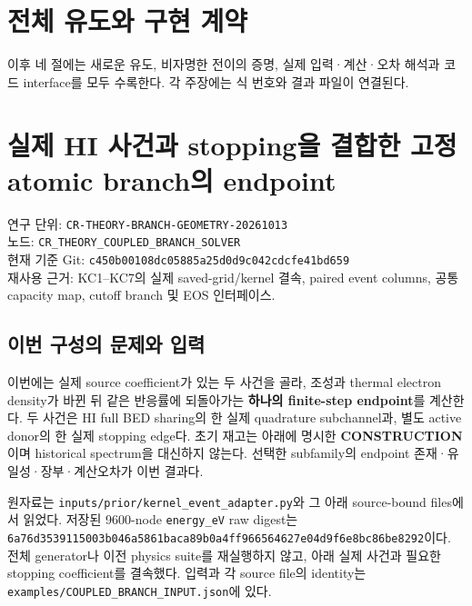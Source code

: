 \hypertarget{uxc804uxccb4-uxc720uxb3c4uxc640-uxad6cuxd604-uxacc4uxc57d}{%
\section{전체 유도와 구현 계약}\label{uxc804uxccb4-uxc720uxb3c4uxc640-uxad6cuxd604-uxacc4uxc57d}}

이후 네 절에는 새로운 유도, 비자명한 전이의 증명, 실제 입력·계산·오차 해석과 코드 interface를 모두 수록한다. 각 주장에는 식 번호와 결과 파일이 연결된다.

\hypertarget{uxc2e4uxc81c-hi-uxc0acuxac74uxacfc-stoppinguxc744-uxacb0uxd569uxd55c-uxace0uxc815-atomic-branchuxc758-endpoint}{%
\section{실제 HI 사건과 stopping을 결합한 고정 atomic branch의 endpoint}\label{uxc2e4uxc81c-hi-uxc0acuxac74uxacfc-stoppinguxc744-uxacb0uxd569uxd55c-uxace0uxc815-atomic-branchuxc758-endpoint}}

연구 단위: \nolinkurl{CR-THEORY-BRANCH-GEOMETRY-20261013}\\
노드: \nolinkurl{CR_THEORY_COUPLED_BRANCH_SOLVER}\\
현재 기준 Git: \nolinkurl{c450b00108dc05885a25d0d9c042cdcfe41bd659}\\
재사용 근거: KC1--KC7의 실제 saved-grid/kernel 결속, paired event columns, 공통 capacity map, cutoff branch 및 EOS 인터페이스.

\hypertarget{uxc774uxbc88-uxad6cuxc131uxc758-uxbb38uxc81cuxc640-uxc785uxb825}{%
\subsection{이번 구성의 문제와 입력}\label{uxc774uxbc88-uxad6cuxc131uxc758-uxbb38uxc81cuxc640-uxc785uxb825}}

이번에는 실제 source coefficient가 있는 두 사건을 골라, 조성과 thermal electron density가 바뀐 뒤 같은 반응률에 되돌아가는 \textbf{하나의 finite-step endpoint}를 계산한다. 두 사건은 HI full BED sharing의 한 실제 quadrature subchannel과, 별도 active donor의 한 실제 stopping edge다. 초기 재고는 아래에 명시한 \textbf{CONSTRUCTION}이며 historical spectrum을 대신하지 않는다. 선택한 subfamily의 endpoint 존재·유일성·장부·계산오차가 이번 결과다.

원자료는 \nolinkurl{inputs/prior/kernel_event_adapter.py}와 그 아래 source-bound files에서 읽었다. 저장된 9600-node \texttt{energy\_eV} raw digest는 \nolinkurl{6a76d3539115003b046a5861baca89b0a4ff966564627e04d9f6e8bc86be8292}이다. 전체 generator나 이전 physics suite를 재실행하지 않고, 아래 실제 사건과 필요한 stopping coefficient를 결속했다. 입력과 각 source file의 identity는 \nolinkurl{examples/COUPLED_BRANCH_INPUT.json}에 있다.

